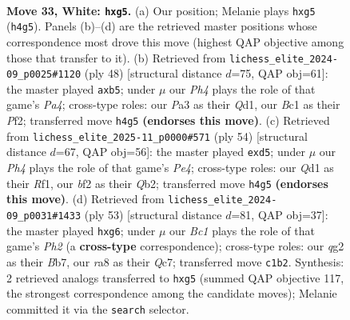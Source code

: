\documentclass[11pt]{article}
\begin{document}
\clearpage

\begin{figure}[p]\centering
\begin{subfigure}{0.46\textwidth}\centering
\resizebox{\linewidth}{!}{%
\newchessgame
\chessboard[
  setfen={r6r/4k2p/1pp1p1p1/6n1/1p1P3P/PP1KP3/R4bq1/2BQ4 w - - 3 33},
  showmover=false,
  pgfstyle=straightmove, color=movearrow, markmove={h4-g5}
]}
\caption{}
\end{subfigure}\hfill
\begin{subfigure}{0.46\textwidth}\centering
\resizebox{\linewidth}{!}{%
\newchessgame
\chessboard[
  setfen={2r3k1/4qpp1/1p2n3/pb1B3p/P2P4/1P4PP/5P2/3QR1K1 w - - 0 25},
  showmover=false,
  pgfstyle=straightmove, color=movearrow, markmove={a4-b5}
]}
\caption{}
\end{subfigure}
\\[4pt]
\begin{subfigure}{0.46\textwidth}\centering
\resizebox{\linewidth}{!}{%
\newchessgame
\chessboard[
  setfen={5rk1/1p4pp/1q6/pP1np3/2PrPp2/3B1P1P/PQ2K3/5R2 w - - 0 28},
  showmover=false,
  pgfstyle=straightmove, color=movearrow, markmove={e4-d5}
]}
\caption{}
\end{subfigure}\hfill
\begin{subfigure}{0.46\textwidth}\centering
\resizebox{\linewidth}{!}{%
\newchessgame
\chessboard[
  setfen={k2r4/pbq4p/1p4P1/3p1p2/3r4/2PN1Q2/PP3P2/2K3RR b - - 0 27},
  showmover=false,
  pgfstyle=straightmove, color=movearrow, markmove={h7-g6}
]}
\caption{}
\end{subfigure}
\caption{\textbf{Move 33, White: \texttt{hxg5}.} (a) Our position; Melanie plays \texttt{hxg5} (\texttt{h4g5}). Panels (b)--(d) are the retrieved master positions whose correspondence most drove this move (highest QAP objective among those that transfer to it). (b) Retrieved from \texttt{lichess\_elite\_2024-09\_p0025\#1120} (ply 48) [structural distance $d$=75, QAP obj=61]: the master played \texttt{axb5}; under $\mu$ our \emph{Ph4} plays the role of that game's \emph{Pa4}; cross-type roles: our \emph{P}a3 as their \emph{Q}d1, our \emph{B}c1 as their \emph{P}f2; transferred move \texttt{h4g5} \textbf{(endorses this move)}. (c) Retrieved from \texttt{lichess\_elite\_2025-11\_p0000\#571} (ply 54) [structural distance $d$=67, QAP obj=56]: the master played \texttt{exd5}; under $\mu$ our \emph{Ph4} plays the role of that game's \emph{Pe4}; cross-type roles: our \emph{Q}d1 as their \emph{R}f1, our \emph{b}f2 as their \emph{Q}b2; transferred move \texttt{h4g5} \textbf{(endorses this move)}. (d) Retrieved from \texttt{lichess\_elite\_2024-09\_p0031\#1433} (ply 53) [structural distance $d$=81, QAP obj=37]: the master played \texttt{hxg6}; under $\mu$ our \emph{Bc1} plays the role of that game's \emph{Ph2} (a \textbf{cross-type} correspondence); cross-type roles: our \emph{q}g2 as their \emph{B}b7, our \emph{r}a8 as their \emph{Q}c7; transferred move \texttt{c1b2}. Synthesis: 2 retrieved analogs transferred to \texttt{hxg5} (summed QAP objective 117, the strongest correspondence among the candidate moves); Melanie committed it via the \texttt{search} selector.}
\label{fig:thought-m64}
\end{figure}
\end{document}
